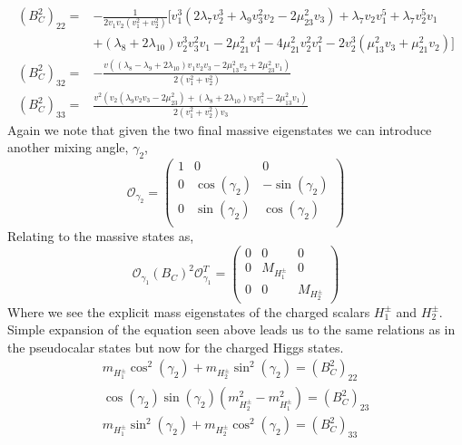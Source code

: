 \begin{equation}
\begin{split}
\left( B^2_C \right)_{22} = & -\frac{1}{2 v_1 v_2 \left(v_1^2+v_2^2\right)} \Bigg[ v_1^3 \left(2 \lambda _7 v_2^3+\lambda _9 v_3^2 v_2-2 \mu _{23}^2 v_3\right)+\lambda _7 v_2 v_1^5+\lambda _7 v_2^5 v_1 \\ & +\left(\lambda _8+2 \lambda _{10}\right) v_2^3 v_3^2 v_1-2 \mu _{21}^2 v_1^4-4 \mu _{21}^2 v_2^2 v_1^2-2 v_2^3 \left(\mu _{13}^2 v_3+\mu _{21}^2 v_2\right) \Bigg] 
%
\\
%
\left( B^2_C \right)_{32}  = &  -\frac{v \left(\left(\lambda _8-\lambda _9+2 \lambda _{10}\right) v_1 v_2 v_3-2 \mu _{13}^2 v_2+2 \mu _{23}^2 v_1\right)}{2 \left(v_1^2+v_2^2\right)}
%
\\
%
\left( B^2_C \right)_{33}  = & \frac{v^2 \left(v_2 \left(\lambda _9 v_2 v_3-2 \mu _{23}^2\right)+\left(\lambda _8+2 \lambda _{10}\right) v_3 v_1^2-2 \mu _{13}^2 v_1\right)}{2 \left(v_1^2+v_2^2\right) v_3}
%
\end{split} 
\end{equation}
Again we note that given the two final massive eigenstates we can introduce another mixing angle, $\gamma_2$, 
%
\begin{equation}
\mathcal{O}_{\gamma_2} = \begin{pmatrix}
1 & 0 & 0 \\
0 & \cos(\gamma_2) & -\sin(\gamma_2) \\ 
0 & \sin(\gamma_2) & \cos(\gamma_2) \\
\end{pmatrix}
\end{equation}
Relating to the massive states as, 
\begin{equation}
\mathcal{O}_{\gamma_1} \left( B_C \right)^2 \mathcal{O}_{\gamma_1}^T   = \begin{pmatrix}
0 & 0 & 0 \\ 
0 & M_{H_1^\pm} & 0 \\ 
0 & 0 & M_{H_2^\pm}
\end{pmatrix} 
\end{equation}
%
Where we see the explicit mass eigenstates of the charged scalars $H^\pm_1$ and $H^\pm_2$. 
%
Simple expansion of the equation seen above leads us to the same relations as in the pseudocalar states but now for the charged Higgs states. 
\begin{equation}
\begin{split}
m_{H^\pm_1} \cos^2(\gamma_2) + m_{H^\pm_2}  \sin^2(\gamma_2) = \left( B_C^2 \right)_{22}   \\
\cos(\gamma_2)\sin(\gamma_2)( m_{H^\pm_2}^2 - m_{H^\pm_1}^2  )  = \left( B_C^2 \right)_{23} \\ 
m_{H^\pm_1} \sin^2(\gamma_2) + m_{H^\pm_2}  \cos^2(\gamma_2) = \left( B_C^2 \right)_{33}
\end{split} 
\end{equation}
